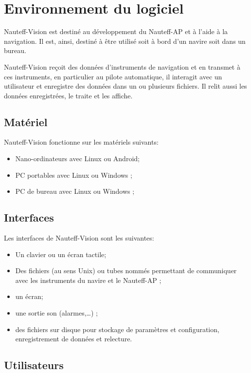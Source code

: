 \documentclass[a4paper,11pt]{report}
\begin{document}
\section{Environnement du logiciel}

Nauteff-Vision est destiné au développement du Nauteff-AP
et à l'aide à la navigation. Il est, ainsi, destiné à être utilisé
soit à bord d'un navire soit dans un bureau.


Nauteff-Vision reçoit des données d'instruments de navigation et en transmet à ces instruments, en particulier au pilote automatique, il interagit avec un utilisateur et
enregistre des données dans un ou plusieurs fichiers.
Il relit aussi les données enregistrées, le traite et les affiche.

\subsection{Matériel}

Nauteff-Vision fonctionne sur les matériels suivants:
\begin{itemize}
	\item Nano-ordinateurs avec Linux ou Android;
    \item PC portables avec Linux ou Windows ;
    \item PC de bureau avec Linux ou Windows ;
\end{itemize}

\subsection{Interfaces}

Les interfaces de Nauteff-Vision sont les suivantes:
\begin{itemize}
	\item Un clavier ou un écran tactile;
	\item Des fichiers (au sens Unix) ou tubes nommés permettant de communiquer avec les instruments du navire et le Nauteff-AP ;
	\item un écran;
	\item une sortie son (alarmes,\dots)  ;
	\item des fichiers sur disque pour stockage de paramètres et configuration, enregistrement de données et relecture.
\end{itemize}

\subsection{Utilisateurs}
\end{document}
